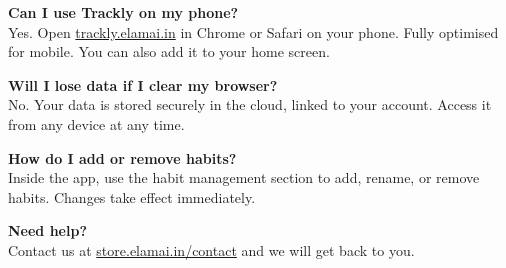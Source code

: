 \documentclass[10pt, a4paper]{article}
\begin{document}
\vspace{5pt}

\noindent\textbf{Can I use Trackly on my phone?}\\
{\fontsize{8.5}{11}\selectfont\color{muted}
Yes. Open \href{https://trackly.elamai.in}{trackly.elamai.in} in Chrome or Safari on your phone. Fully optimised for mobile. You can also add it to your home screen.}

\vspace{5pt}

\noindent\textbf{Will I lose data if I clear my browser?}\\
{\fontsize{8.5}{11}\selectfont\color{muted}
No. Your data is stored securely in the cloud, linked to your account. Access it from any device at any time.}

\vspace{5pt}

\noindent\textbf{How do I add or remove habits?}\\
{\fontsize{8.5}{11}\selectfont\color{muted}
Inside the app, use the habit management section to add, rename, or remove habits. Changes take effect immediately.}

\vspace{5pt}

\noindent\textbf{Need help?}\\
{\fontsize{8.5}{11}\selectfont\color{muted}
Contact us at \href{https://store.elamai.in/contact}{store.elamai.in/contact} and we will get back to you.}

\newpage

\thispagestyle{empty}

\vspace*{\fill}
\end{document}
